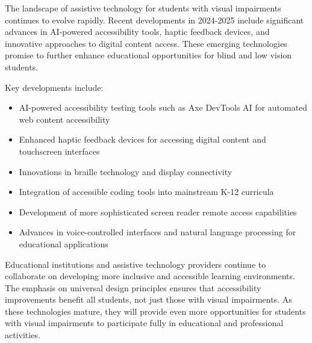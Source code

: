 The landscape of assistive technology for students with visual impairments continues to evolve rapidly. Recent developments in 2024-2025 include significant advances in AI-powered accessibility tools, haptic feedback devices, and innovative approaches to digital content access. These emerging technologies promise to further enhance educational opportunities for blind and low vision students.

Key developments include:
\begin{itemize}
 \item AI-powered accessibility testing tools such as Axe DevTools AI for automated web content accessibility
 \item Enhanced haptic feedback devices for accessing digital content and touchscreen interfaces
 \item Innovations in braille technology and display connectivity
 \item Integration of accessible coding tools into mainstream K-12 curricula
 \item Development of more sophisticated screen reader remote access capabilities
 \item Advances in voice-controlled interfaces and natural language processing for educational applications
\end{itemize}

Educational institutions and assistive technology providers continue to collaborate on developing more inclusive and accessible learning environments. The emphasis on universal design principles ensures that accessibility improvements benefit all students, not just those with visual impairments. As these technologies mature, they will provide even more opportunities for students with visual impairments to participate fully in educational and professional activities.
